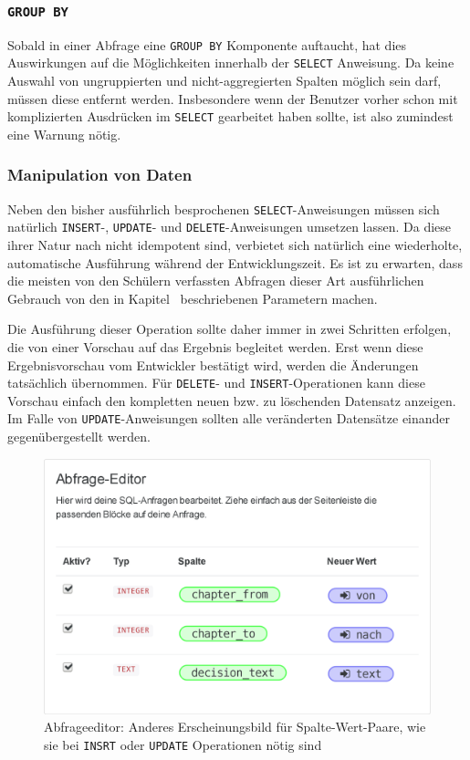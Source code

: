 \subsubsection{\texttt{GROUP BY}}

Sobald in einer Abfrage eine \texttt{GROUP BY} Komponente auftaucht, hat dies Auswirkungen auf die Möglichkeiten innerhalb der \texttt{SELECT} Anweisung. Da keine Auswahl von ungruppierten und nicht-aggregierten Spalten möglich sein darf, müssen diese entfernt werden. Insbesondere wenn der Benutzer vorher schon mit komplizierten Ausdrücken im \texttt{SELECT} gearbeitet haben sollte, ist also zumindest eine Warnung nötig.

\subsubsection{Manipulation von Daten}

Neben den bisher ausführlich besprochenen \texttt{SELECT}-Anweisungen müssen sich natürlich \texttt{INSERT}-, \texttt{UPDATE}- und \texttt{DELETE}-Anweisungen umsetzen lassen. Da diese ihrer Natur nach nicht idempotent sind, verbietet sich natürlich eine wiederholte, automatische Ausführung während der Entwicklungszeit. Es ist zu erwarten, dass die meisten von den Schülern verfassten Abfragen dieser Art ausführlichen Gebrauch von den in Kapitel~ beschriebenen Parametern machen.

Die Ausführung dieser Operation sollte daher immer in zwei Schritten erfolgen, die von einer Vorschau auf das Ergebnis begleitet werden. Erst wenn diese Ergebnisvorschau vom Entwickler bestätigt wird, werden die Änderungen tatsächlich übernommen. Für \texttt{DELETE}- und \texttt{INSERT}-Operationen kann diese Vorschau einfach den kompletten neuen bzw. zu löschenden Datensatz anzeigen. Im Falle von \texttt{UPDATE}-Anweisungen sollten alle veränderten Datensätze einander gegenübergestellt werden.

\begin{figure}[h]
  \includegraphics[width=\textwidth]{images/sql-insert-key-value-pairs}
  \caption{Abfrageeditor: Anderes Erscheinungsbild für Spalte-Wert-Paare, wie sie bei \texttt{INSRT} oder \texttt{UPDATE} Operationen nötig sind}
  \label{fig:screen-sql-editor-insert-key-value-pairs}
\end{figure}

